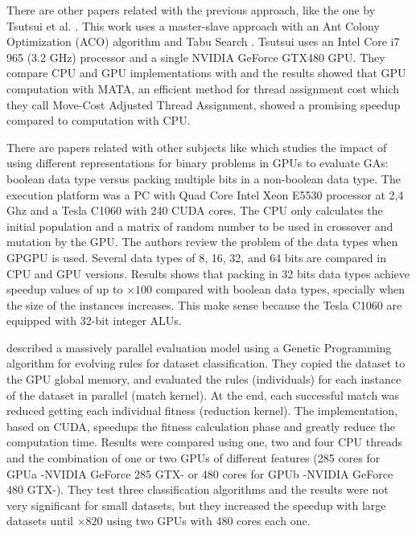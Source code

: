 \documentclass[Afour,sageh,times]{sagej}
\begin{document}
There are other papers related with the previous approach, like the one by Tsutsui et al. \citep{Tsutsui:2011:GECCO}. This work uses a master-slave approach with an Ant Colony Optimization (ACO) algorithm \citep{Dorigo:1999:ACO:329055.329062} and Tabu Search \citep{Glover:1997:TS:549765}. Tsutsui uses an Intel Core i7 965 (3.2 GHz) processor and a single NVIDIA GeForce GTX480 GPU. They compare CPU and GPU implementations with and the results showed that GPU computation with MATA, an efficient method for thread assignment cost which they call Move-Cost Adjusted Thread Assignment, showed a promising speedup compared to computation with CPU.

There are papers related with other subjects %
like \citep{Pedemonte:2011:BOG:2001858.2002031} which studies the impact of using different representations for binary problems in GPUs to evaluate GAs: boolean data type versus packing multiple bits in a non-boolean data type. The execution platform was a PC with Quad Core Intel Xeon E5530 processor at 2,4 Ghz and a Tesla C1060 with 240 CUDA cores. The CPU only calculates the initial population and a matrix of random number to be used in crossover and mutation by the GPU. The authors review the problem of the data types when GPGPU is used. Several data types of 8, 16, 32, and 64 bits are compared in CPU and GPU versions. Results shows that
packing in 32 bits data types achieve speedup values of up to
$\times100$ compared with boolean data types, specially when the size
of the instances increases. This make sense because the Tesla C1060
are equipped with 32-bit integer ALUs.  

\cite{SpeedingTheEvaluationofGPCano:2012} described a massively parallel evaluation model using a Genetic Programming algorithm for evolving rules for dataset classification. They copied the dataset to the GPU global memory, and evaluated the rules (individuals) for each instance of the dataset in parallel (match kernel). At the end, each successful match was reduced getting each individual fitness (reduction kernel). The implementation, based on CUDA, speedups the fitness calculation phase and greatly reduce the computation time. Results were compared using one, two and four CPU threads and the combination of one or two GPUs of different features (285 cores for GPUa -NVIDIA GeForce 285 GTX- or 480 cores for GPUb -NVIDIA GeForce 480 GTX-). They test three classification algorithms and the results were not very significant for small datasets, but they increased the speedup with large datasets until $\times820$ using two GPUs with 480 cores each one.
\end{document}
